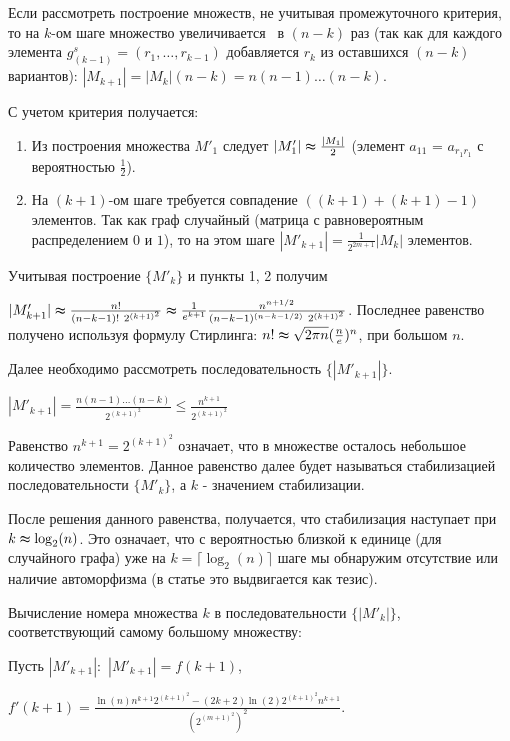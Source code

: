 Если рассмотреть построение множеств, не учитывая промежуточного критерия, то на $k$-ом шаге множество увеличивается \ в $(n-k)$ раз (так как для каждого элемента $g^s_{(k-1)} = (r_1, \ldots, r_{k-1})$ добавляется $r_k$ из оставшихся $(n-k)$ вариантов): $|M_{k+1}| = |M_{k}|(n-k)= n(n-1)\ldots(n-k)$.

С учетом критерия получается:

\begin{enumerate}
\item Из построения множества $M'_1$ следует $|M'_1|\thickapprox\frac{|M_1|}{2}$ (элемент $a_{11}$ = $a_{r_1r_1}$ с вероятностью $\frac{1}{2}$).
\item На $(k+1)$-ом шаге требуется совпадение $((k+1) + (k+1) - 1)$ элементов. Так как граф случайный (матрица с равновероятным распределением $0$ и $1$), то на этом шаге $|M'_{k+1}| = \frac{1}{2^{2m+1}}|M_k|$ элементов.
\end{enumerate}

 Учитывая построение $\{M'_k\}$ и пункты 1, 2 получим
 
 $|M'_{k+1}| \thickapprox \frac{n!}{(n-k-1)!~2^{(k+1)^2}} \thickapprox \frac{1}{e^{k+1}} \frac{n^{n+1/2}}{(n-k-1)^{(n-k-1/2)}~2^{(k+1)^2}}$. Последнее равенство получено используя формулу Стирлинга: $n!\thickapprox \sqrt{2\pi n}(\frac{n}{e})^n$, при большом $n$.
 


Далее необходимо рассмотреть последовательность $\{|M'_{k+1}|\}$. 

$|M'_{k+1}| = \frac{n(n-1)\ldots(n-k)}{2^{(k+1)^2}} \le \frac{n^{k+1}}{2^{(k+1)^2}}$

Равенство $n^{k+1} = 2^{(k+1)^2}$ означает, что в множестве осталось небольшое количество элементов. Данное равенство далее будет называться стабилизацией последовательности $\{M'_k\}$, а $k$ - значением стабилизации.

После решения данного равенства, получается, что стабилизация наступает при $k \thickapprox \log _2(n) $.
Это означает, что с вероятностью близкой к единице (для случайного графа) уже на $k = \lceil\log _2(n) \rceil$ шаге мы обнаружим отсутствие или наличие автоморфизма (в статье это выдвигается как тезис).

Вычисление номера множества $k$ в последовательности $\{|M'_{k}|\}$, соответствующий самому большому множеству:

Пусть $|M'_{k+1}|:$ $|M'_{k+1}| = f(k+1)$, 

$f'(k+1) = \frac{\ln(n)n^{k+1}2^{(k+1)^2}-(2k+2)\ln(2)2^{(k+1)^2}n^{k+1}}{(2^{(m+1)^2})^2}$. 

